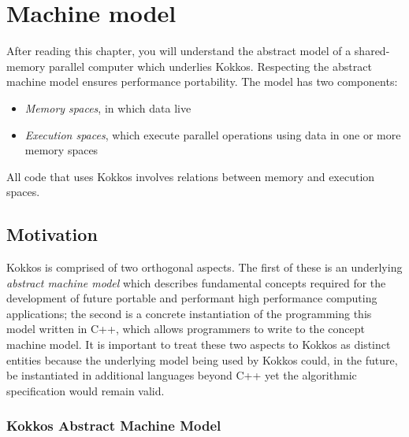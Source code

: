 \chapter{Machine model}
\label{C:Model}

After reading this chapter, you will understand the abstract model of
a shared-memory parallel computer which underlies Kokkos.  
Respecting the abstract machine model ensures performance portability.
The model has two components:
\begin{itemize}
\item \emph{Memory spaces}, in which data live
\item \emph{Execution spaces}, which execute parallel operations using
  data in one or more memory spaces
\end{itemize}
All code that uses Kokkos involves relations between memory and execution spaces.

\section{Motivation}\label{S:Model:Motivations}

Kokkos is comprised of two orthogonal aspects. The first of these is 
an underlying {\em abstract machine model} which describes fundamental
concepts required for the development of future portable and performant
high performance computing applications; the second is a concrete instantiation
of the programming this model written in C++, which allows programmers
to write to the concept machine model. It is important to treat these
two aspects to Kokkos as distinct entities because the underlying model
being used by Kokkos could, in the future, be instantiated in additional
languages beyond C++ yet the algorithmic specification would remain
valid.

\subsection{Kokkos Abstract Machine Model}

